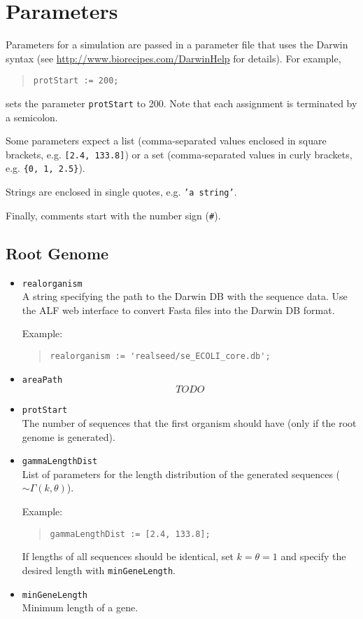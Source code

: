 \documentclass[11pt]{article}
\begin{document}
\section{Parameters}
\label{sec.params}
Parameters for a simulation are passed in a parameter file that uses the Darwin syntax (see \url{http://www.biorecipes.com/DarwinHelp} for details). For example,
\begin{quote}
\texttt{protStart := 200;}
\end{quote}
sets the parameter \texttt{protStart} to 200. Note that each assignment is terminated by a semicolon.

Some parameters expect a list (comma-separated values enclosed in square brackets, e.g. \texttt{[2.4, 133.8]}) or a set (comma-separated values in curly brackets, e.g. \texttt{\{0, 1, 2.5\}}).

Strings are enclosed in single quotes, e.g. \texttt{'a string'}.

Finally, comments start with the number sign (\verb|#|).


%
\subsection{Root Genome}
\begin{itemize}
\item{\texttt{realorganism}} \hfill \\
 A string specifying the path to the Darwin DB with the sequence data. Use the ALF web interface to convert Fasta files into the Darwin DB format.

Example:
\begin{quote}
\begin{verbatim}
realorganism := 'realseed/se_ECOLI_core.db';
\end{verbatim}
\end{quote}
\item{\texttt{areaPath}} \hfill \\
\[TODO\]
\item{\texttt{protStart}} \hfill \\
The number of sequences that the first organism should have (only if the root genome is generated).
\item{\texttt{gammaLengthDist}} \hfill \\
List of parameters for the length distribution of the generated sequences ($\sim\Gamma(k,\theta)$). 

Example:
\begin{quote}
\begin{verbatim}
gammaLengthDist := [2.4, 133.8];
\end{verbatim}
\end{quote}
If lengths of all sequences should be identical, set $k=\theta=1$ and specify the desired length with \texttt{minGeneLength}.

\item{\texttt{minGeneLength}} \hfill \\
Minimum length of a gene.
\end{itemize}
\end{document}
